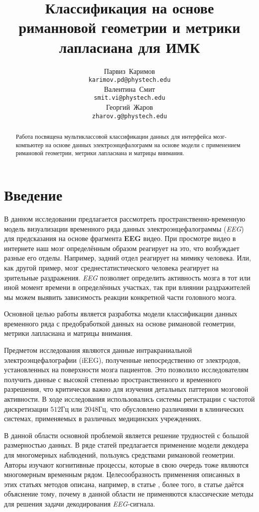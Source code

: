 \documentclass{article}
\title{Классификация на основе риманновой геометрии и метрики лапласиана для ИМК}
\author{ Парвиз~Каримов\\%
	\texttt{karimov.pd@phystech.edu} \\
	\And
	Валентина~Смит \\
	\texttt{smit.vi@phystech.edu} \\
	\And
	Георгий~Жаров\\
	\texttt{zharov.g@phystech.edu} \\
}
\begin{document}
\maketitle

\begin{abstract}
	Работа посвящена мультиклассовой классификации данных для интерфейса мозг-компьютер на основе данных электроэнцефалограмм на основе модели с применением римановой геометрии, метрики лапласиана и матрицы внимания.
\end{abstract}



\section{Введение}
В данном исследовании предлагается рассмотреть пространственно-временную модель визуализации
временного ряда данных электроэнцефалограммы (\textit{EEG}) для предсказания на основе фрагмента \textbf{EEG} видео. При просмотре видео в интернете наш мозг определённым образом реагирует на это, что возбуждает разные его отделы. Например, задний отдел реагирует на мимику человека. Или, как другой пример, мозг среднестатистического человека реагирует на зрительные раздражения. \textit{EEG} позволяет определить активность мозга в тот или иной момент времени в определённых участках, так при влиянии раздражителей мы можем выявить зависимость реакции конкретной части головного мозга.
\par
Основной целью работы является разработка модели классификации данных временного ряда с предобработкой данных на основе римановой геометрии, метрики лапласиана и матрицы внимания.
\par
Предметом исследования являются данные интракраниальной электроэнцефалографии (iEEG)\cite{data2022}, полученные непосредственно от электродов, установленных на поверхности мозга пациентов. Это позволило исследователям получить данные с высокой степенью пространственного и временного разрешения, что критически важно для изучения детальных паттернов мозговой активности. В ходе исследования использовались системы регистрации с частотой дискретизации $512$Гц или $2048$Гц, что обусловлено различиями в клинических системах, применяемых в различных медицинских учреждениях.
\par
В данной области основной проблемой является решение трудностей с большой размерностью данных.
В ряде статей \cite{BARACHANT2013172, barachant2012} предлагается применение модели декодера для многомерных наблюдений, пользуясь средствами римановой геометрии. Авторы изучают когнитивные процессы, которые в свою очередь тоже являются многомерным временным рядом. Целесообразность применения описанных в этих статьях методов описана, например, в статье \cite{Congedo2017}, более того, в статье даётся объяснение тому, почему в данной области не применяются классические методы для решения задачи декодирования \textit{EEG}-сигнала.
\end{document}
